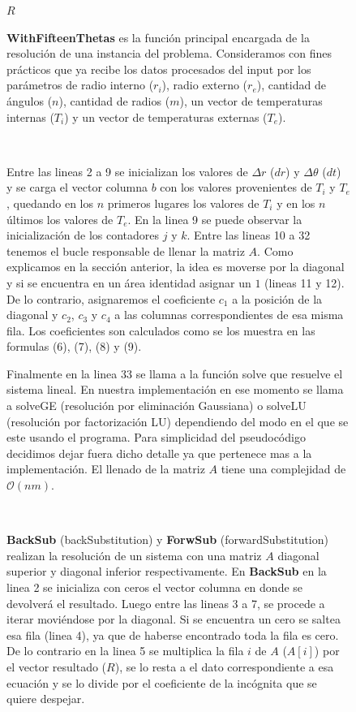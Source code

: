 \begin{figure}[!htb]
\begin{algorithmic}[1]
      \State \Return $R$
    \EndFunction
  \end{algorithmic} 
  
\endminipage\hfill
{}
\endminipage\hfill
{}

\textbf{WithFifteenThetas} es la funci\'on principal encargada de la resoluci\'on de una instancia del problema. Consideramos con fines pr\'acticos que ya recibe los datos procesados del input por los par\'ametros de radio interno ($r_i$), radio externo ($r_e$), cantidad de \'angulos ($n$), cantidad de radios ($m$), un vector de temperaturas internas ($T_i$) y un vector de temperaturas externas ($T_e$).  

~

Entre las lineas 2 a 9 se inicializan los valores de $\Delta r$ ($dr$) y $\Delta \theta$ ($dt$) y se carga el vector columna $b$ con los valores provenientes de $T_i$ y $T_e$, quedando en los $n$ primeros lugares los valores de $T_i$ y en los $n$ \'ultimos los valores de $T_e$. En la linea 9 se puede observar la inicializaci\'on de los contadores $j$ y $k$. Entre las lineas 10 a 32 tenemos el bucle responsable de llenar la matriz $A$. Como explicamos en la secci\'on anterior, la idea es moverse por la diagonal y si se encuentra en un \'area identidad asignar un $1$ (lineas 11 y 12). De lo contrario, asignaremos el coeficiente $c_1$ a la posici\'on de la diagonal y $c_2$, $c_3$ y $c_4$ a las columnas correspondientes de esa misma fila. Los coeficientes son calculados como se los muestra en las formulas (6), (7), (8) y (9). 

Finalmente en la linea 33 se llama a la funci\'on solve que resuelve el sistema lineal. En nuestra implementaci\'on en ese momento se llama a solveGE (resoluci\'on por eliminaci\'on Gaussiana) o solveLU (resoluci\'on por factorizaci\'on LU) dependiendo del modo en el que se este usando el programa. Para simplicidad del pseudoc\'odigo decidimos dejar fuera dicho detalle ya que pertenece mas a la implementaci\'on. El llenado de la matriz $A$ tiene una complejidad de $\mathcal{O}(nm)$.

~

\textbf{BackSub} (backSubstitution) y \textbf{ForwSub} (forwardSubstitution) realizan la resoluci\'on de un sistema con una matriz $A$ diagonal superior y diagonal inferior respectivamente. En \textbf{BackSub} en la linea 2 se inicializa con ceros el vector columna en donde se devolver\'a el resultado. Luego entre las lineas 3 a 7, se procede a iterar movi\'endose por la diagonal. Si se encuentra un cero se saltea esa fila (linea 4), ya que de haberse encontrado toda la fila es cero. De lo contrario en la linea 5 se multiplica la fila $i$ de $A$ ($A[i]$) por el vector resultado ($R$), se lo resta a el dato correspondiente a esa ecuaci\'on y se lo divide por el coeficiente de la inc\'ognita que se quiere despejar. 


\end{figure}
